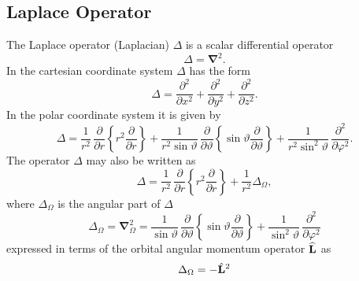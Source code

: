\subsection{Laplace Operator}\label{sec:1.3.2}
The Laplace operator (Laplacian) \(\Delta\) is a scalar differential operator
\begin{equation}
\Delta=\boldsymbol{\nabla}^{2} . \label{eq:1:3:11}
\end{equation}
In the cartesian coordinate system \(\Delta\) has the form
\begin{equation}
\Delta=\frac{\partial^{2}}{\partial x^{2}}+\frac{\partial^{2}}{\partial y^{2}}+\frac{\partial^{2}}{\partial z^{2}} .\label{eq:1:3:12}
\end{equation}
In the polar coordinate system it is given by
\begin{equation}
\Delta=\frac{1}{r^{2}} \, \frac{\partial}{\partial r}\left\{r^{2} \frac{\partial}{\partial r}\right\}+\frac{1}{r^{2} \sin \vartheta} \, \frac{\partial}{\partial \vartheta}\left\{\sin \vartheta \frac{\partial}{\partial \vartheta}\right\}+\frac{1}{r^{2} \sin ^{2} \vartheta} \, \frac{\partial^{2}}{\partial \varphi^{2}} . \label{eq:1:3:13}
\end{equation}
The operator \(\Delta\) may also be written as
\begin{equation}
\Delta=\frac{1}{r^{2}} \, \frac{\partial}{\partial r}\left\{r^{2} \frac{\partial}{\partial r}\right\}+\frac{1}{r^{2}} \Delta_{\Omega}, \label{eq:1:3:14}
\end{equation}
where \(\Delta_{\Omega}\) is the angular part of \(\Delta\)
\begin{equation}
\Delta_{\Omega}=\boldsymbol{\nabla}_{\Omega}^{2}=\frac{1}{\sin \vartheta} \, \frac{\partial}{\partial \vartheta}\left\{\sin \vartheta \frac{\partial}{\partial \vartheta}\right\}+\frac{1}{\sin ^{2} \vartheta} \, \frac{\partial^{2}}{\partial \varphi^{2}} \label{eq:1:3:15}
\end{equation}
expressed in terms of the orbital angular momentum operator \(\widehat{\mathbf{L}}\) as
\begin{equation}
\Delta_{\Omega}=-\hat{\mathbf{L}}^{2} \label{eq:1:3:16}
\end{equation}
